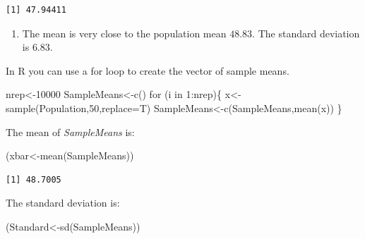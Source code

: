 \documentclass[
  letterpaper,
  DIV=11,
  numbers=noendperiod]{scrreprt}
\newenvironment{Shaded}{\begin{snugshade}}{\end{snugshade}}
\newcommand{\AttributeTok}[1]{\textcolor[rgb]{0.40,0.45,0.13}{#1}}
\newcommand{\ControlFlowTok}[1]{\textcolor[rgb]{0.00,0.23,0.31}{#1}}
\newcommand{\DecValTok}[1]{\textcolor[rgb]{0.68,0.00,0.00}{#1}}
\newcommand{\FunctionTok}[1]{\textcolor[rgb]{0.28,0.35,0.67}{#1}}
\newcommand{\NormalTok}[1]{\textcolor[rgb]{0.00,0.23,0.31}{#1}}
\newcommand{\OtherTok}[1]{\textcolor[rgb]{0.00,0.23,0.31}{#1}}
\newcommand{\SpecialCharTok}[1]{\textcolor[rgb]{0.37,0.37,0.37}{#1}}
\providecommand{\tightlist}{%
  \setlength{\itemsep}{0pt}\setlength{\parskip}{0pt}}\usepackage{longtable,booktabs,array}
\begin{document}
\begin{verbatim}
[1] 47.94411
\end{verbatim}

\begin{blackbox}

\begin{enumerate}
\def\labelenumi{\arabic{enumi}.}
\setcounter{enumi}{1}
\tightlist
\item
  The mean is very close to the population mean \(48.83\). The standard
  deviation is \(6.83\).
\end{enumerate}

\end{blackbox}

In R you can use a for loop to create the vector of sample means.

\begin{Shaded}
\begin{Highlighting}[numbers=left,,]
\NormalTok{nrep}\OtherTok{\textless{}{-}}\DecValTok{10000}
\NormalTok{SampleMeans}\OtherTok{\textless{}{-}}\FunctionTok{c}\NormalTok{()}
\ControlFlowTok{for}\NormalTok{ (i }\ControlFlowTok{in} \DecValTok{1}\SpecialCharTok{:}\NormalTok{nrep)\{}
\NormalTok{  x}\OtherTok{\textless{}{-}}\FunctionTok{sample}\NormalTok{(Population,}\DecValTok{50}\NormalTok{,}\AttributeTok{replace=}\NormalTok{T)}
\NormalTok{  SampleMeans}\OtherTok{\textless{}{-}}\FunctionTok{c}\NormalTok{(SampleMeans,}\FunctionTok{mean}\NormalTok{(x))}
\NormalTok{\}}
\end{Highlighting}
\end{Shaded}

The mean of \emph{SampleMeans} is:

\begin{Shaded}
\begin{Highlighting}[numbers=left,,]
\NormalTok{(xbar}\OtherTok{\textless{}{-}}\FunctionTok{mean}\NormalTok{(SampleMeans))}
\end{Highlighting}
\end{Shaded}

\begin{verbatim}
[1] 48.7005
\end{verbatim}

The standard deviation is:

\begin{Shaded}
\begin{Highlighting}[numbers=left,,]
\NormalTok{(Standard}\OtherTok{\textless{}{-}}\FunctionTok{sd}\NormalTok{(SampleMeans))}
\end{Highlighting}
\end{Shaded}
\end{document}

